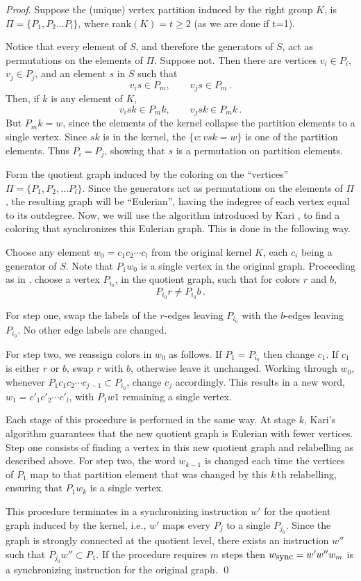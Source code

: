 %
\begin{proof}   
Suppose the (unique) vertex partition induced by the right group $K$, is $\Pi = \{P_1,P_2 \ldots P_l\}$, where rank$(K) = t \ge 2$ (as we are done if t=1).

Notice that every element of $S$, and therefore the generators of $S$, act as permutations on the elements of $\Pi$.
Suppose not.
Then there are vertices $v_i \in P_i$, $v_j \in P_j$, and an element $s$ in $S$ such that
\[
  v_is \in P_m, \qquad v_js \in P_m\,.
\]
Then, if $k$ is any element of $K$,
\[
  v_isk \in P_mk, \qquad v_jsk \in P_mk\,.
\]
But $P_mk = w$, since the elements of the kernel collapse the partition elements to a single vertex.
Since $sk$ is in the kernel, the $\{v: vsk = w\}$ is one of the partition elements.  
Thus $P_i = P_j$, showing that $s$ is a permutation on partition elements.

Form the quotient graph induced by the coloring on the ``vertices'' $\Pi = \{P_1,P_2, \ldots  P_l\}$.
Since the generators act as permutations on the elements of $\Pi$, the resulting graph will be ``Eulerian'', having the indegree of each vertex equal to its outdegree.
Now, we will use the algorithm introduced by Kari \cite{K}, to find a coloring that synchronizes this Eulerian graph.
This is done in the following way.

Choose any element $w_0 = c_1c_2 \cdots c_l$  from the original kernel $K$, each $c_i$ being a generator of $S$.
Note that $P_1w_0$ is a single vertex in the original graph.
Proceeding as in \cite{K}, choose a vertex $P_{i_0}$, in the quotient graph, such that for colors $r$ and $b$,
\[
  P_{i_0}r \not= P_{i_0}b\,.
\]

For step one, swap the labels of the $r$-edges leaving $P_{i_0}$ with the $b$-edges leaving $P_{i_0}$.
No other edge labels are changed.

For step two, we reassign colors in $w_0$ as follows.
If $P_1 = P_{i_0}$ then change $c_1$.
If $c_1$ is either $r$ or $b$, swap $r$ with $b$, otherwise leave it unchanged.
Working through $w_0$, whenever $P_1c_1c_2 \cdots c_{j-1} \subset P_{i_0}$, change $c_j$ accordingly.
This results in a new word, $w_1 = c'_1c'_2 \cdots c'_l$, with $P_1w1$ remaining a single vertex.

Each stage of this procedure is performed in the same way.
At stage $k$, Kari's algorithm guarantees that the new quotient graph is Eulerian with fewer vertices.
Step one consists of finding a vertex in this new quotient graph and relabelling as described above.
For step two, the word $w_{k-1}$ is changed each time the vertices of $P_1$ map to that partition element that was changed by this $k$\,th relabelling, ensuring that $P_1w_k$ is a single vertex.

This procedure terminates in a synchronizing instruction $w'$ for the quotient graph induced by the kernel, i.e., $w'$ maps every $P_j$ to a single $P_{j_0}$.
Since the graph is strongly connected at the quotient level, there exists an instruction $w''$ such that $P_{j_0}w'' \subset P_1$.
If the procedure requires $m$ steps then $w_{\hbox{\small sync}} = w'w''w_m$ is a synchronizing instruction for the original graph.
\qed
\end{proof}
